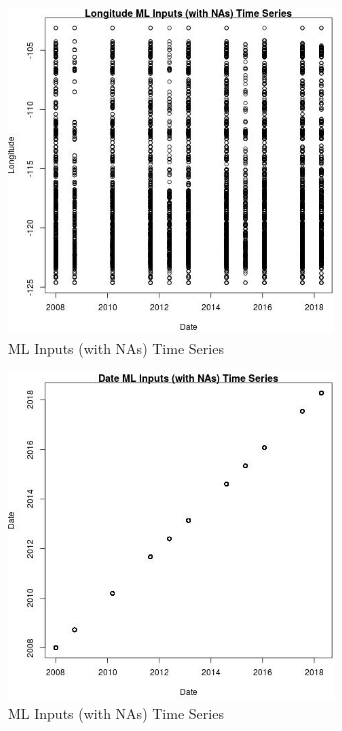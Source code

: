 \begin{figure} 
\centering  
\includegraphics[width=0.77\textwidth]{Code_Outputs/Report_ML_input_PM25_Step4_part_e_de_duplicated_aves_compiled_2019-05-18wNAs_LongitudevDate.jpg} 
\caption{\label{fig:Report_ML_input_PM25_Step4_part_e_de_duplicated_aves_compiled_2019-05-18wNAsLongitudevDate}ML Inputs (with NAs) Time Series} 
\end{figure} 
 

\begin{figure} 
\centering  
\includegraphics[width=0.77\textwidth]{Code_Outputs/Report_ML_input_PM25_Step4_part_e_de_duplicated_aves_compiled_2019-05-18wNAs_DatevDate.jpg} 
\caption{\label{fig:Report_ML_input_PM25_Step4_part_e_de_duplicated_aves_compiled_2019-05-18wNAsDatevDate}ML Inputs (with NAs) Time Series} 
\end{figure} 
 

